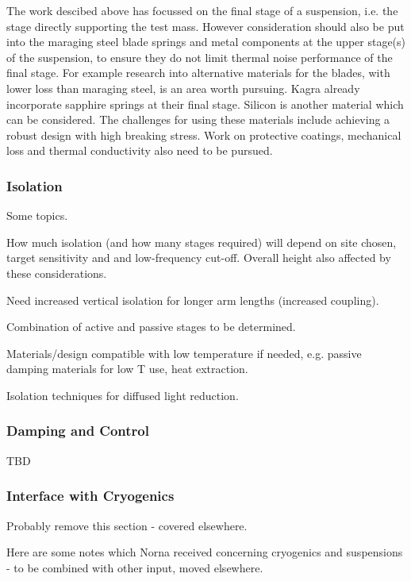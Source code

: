 The work descibed above has focussed on the final stage of a suspension, i.e. the stage directly supporting the test mass. However consideration should also be put into the maraging steel blade springs and metal components at the upper stage(s) of the suspension, to ensure they do not limit thermal noise performance of the final stage. For example research into alternative materials for the blades, with lower loss than maraging steel, is an area worth pursuing. Kagra already incorporate sapphire springs at their final stage. Silicon is another material which can be considered. The challenges for using these materials include achieving a robust design with high breaking stress. Work on protective coatings, mechanical loss and thermal conductivity also need to be pursued.

\subsubsection{Isolation}

Some topics.

How much isolation (and how many stages required) will depend on site chosen, target sensitivity and and low-frequency cut-off. Overall height also affected by these considerations.

Need increased vertical isolation for longer arm lengths (increased coupling).

Combination of active and passive stages to be determined.

Materials/design compatible with low temperature if needed, e.g. passive damping materials for low T use, heat extraction.   

Isolation techniques for diffused light reduction.       



\subsubsection{Damping and Control}

TBD


\subsubsection{Interface with Cryogenics}

Probably remove this section - covered elsewhere.

Here are some notes which Norna received concerning cryogenics and suspensions - to be combined with other input, moved elsewhere.

